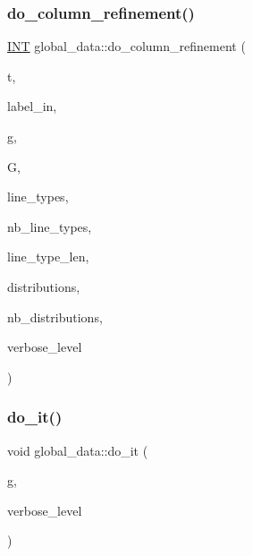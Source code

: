 \mbox{\label{classglobal__data_ab720d7fecd03c537fba49b15ec1298e7}} 
\subsubsection{\texorpdfstring{do\+\_\+column\+\_\+refinement()}{do\_column\_refinement()}}
{\footnotesize\ttfamily \mbox{\hyperlink{galois_8h_a09fddde158a3a20bd2dcadb609de11dc}{I\+NT}} global\+\_\+data\+::do\+\_\+column\+\_\+refinement (\begin{DoxyParamCaption}\item[{\mbox{\hyperlink{galois_8h_a09fddde158a3a20bd2dcadb609de11dc}{I\+NT}}}]{t,  }\item[{\mbox{\hyperlink{galois_8h_ab6cc7b4aeb6ea31aba2b3fbfc83ff5e6}{B\+Y\+TE}} $\ast$}]{label\+\_\+in,  }\item[{ofstream \&}]{g,  }\item[{\mbox{\hyperlink{classtdo__scheme}{tdo\+\_\+scheme}} \&}]{G,  }\item[{\mbox{\hyperlink{galois_8h_a09fddde158a3a20bd2dcadb609de11dc}{I\+NT}} $\ast$}]{line\+\_\+types,  }\item[{\mbox{\hyperlink{galois_8h_a09fddde158a3a20bd2dcadb609de11dc}{I\+NT}}}]{nb\+\_\+line\+\_\+types,  }\item[{\mbox{\hyperlink{galois_8h_a09fddde158a3a20bd2dcadb609de11dc}{I\+NT}}}]{line\+\_\+type\+\_\+len,  }\item[{\mbox{\hyperlink{galois_8h_a09fddde158a3a20bd2dcadb609de11dc}{I\+NT}} $\ast$}]{distributions,  }\item[{\mbox{\hyperlink{galois_8h_a09fddde158a3a20bd2dcadb609de11dc}{I\+NT}}}]{nb\+\_\+distributions,  }\item[{\mbox{\hyperlink{galois_8h_a09fddde158a3a20bd2dcadb609de11dc}{I\+NT}}}]{verbose\+\_\+level }\end{DoxyParamCaption})}

\mbox{\label{classglobal__data_aa78a1e32894e05dd89133596873bdfbc}} 
\subsubsection{\texorpdfstring{do\+\_\+it()}{do\_it()}}
{\footnotesize\ttfamily void global\+\_\+data\+::do\+\_\+it (\begin{DoxyParamCaption}\item[{ofstream \&}]{g,  }\item[{\mbox{\hyperlink{galois_8h_a09fddde158a3a20bd2dcadb609de11dc}{I\+NT}}}]{verbose\+\_\+level }\end{DoxyParamCaption})}

